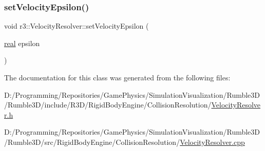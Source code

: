 \mbox{\label{classr3_1_1_velocity_resolver_a91b4f4f3c064f11983ae9dbe40232c86}} 
\subsubsection{\texorpdfstring{set\+Velocity\+Epsilon()}{setVelocityEpsilon()}}
{\footnotesize\ttfamily void r3\+::\+Velocity\+Resolver\+::set\+Velocity\+Epsilon (\begin{DoxyParamCaption}\item[{\mbox{\hyperlink{namespacer3_ab2016b3e3f743fb735afce242f0dc1eb}{real}}}]{epsilon }\end{DoxyParamCaption})}



The documentation for this class was generated from the following files\+:\begin{DoxyCompactItemize}
\item 
D\+:/\+Programming/\+Repositories/\+Game\+Physics/\+Simulation\+Visualization/\+Rumble3\+D/\+Rumble3\+D/include/\+R3\+D/\+Rigid\+Body\+Engine/\+Collision\+Resolution/\mbox{\hyperlink{_velocity_resolver_8h}{Velocity\+Resolver.\+h}}\item 
D\+:/\+Programming/\+Repositories/\+Game\+Physics/\+Simulation\+Visualization/\+Rumble3\+D/\+Rumble3\+D/src/\+Rigid\+Body\+Engine/\+Collision\+Resolution/\mbox{\hyperlink{_velocity_resolver_8cpp}{Velocity\+Resolver.\+cpp}}\end{DoxyCompactItemize}

